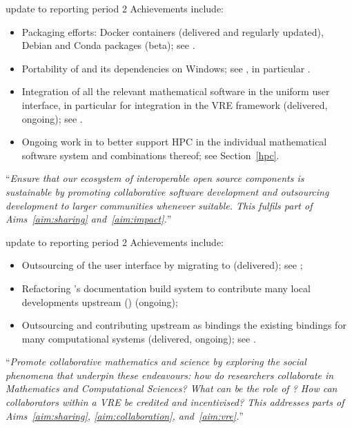 \begin{compactenum}[\bf O1\rm:]
\begin{oldpart}{update to reporting period 2}
  Achievements include:
  \begin{itemize}
  \item Packaging efforts: Docker containers (delivered and
    regularly updated), Debian and Conda packages (beta); see
    .
  \item Portability of \Sage and its dependencies on Windows; see
    , in particular
    .
  \item Integration of all the relevant mathematical software in the
    uniform \Jupyter user interface, in particular for integration in
    the VRE framework (delivered, ongoing); see
    .
  \item Ongoing work in  to better support HPC in the
    individual mathematical software system and combinations thereof;
    see Section~\ref{hpc}.
  \end{itemize}
\end{oldpart}

\item \label{objective:sustainable} ``\emph{Ensure that our ecosystem of
  interoperable open source components is \emph{sustainable} by
  promoting collaborative software development and outsourcing
  development to larger communities whenever suitable. This fulfils
  part of Aims~\ref{aim:sharing} and~\ref{aim:impact}.}''

\begin{oldpart}{update to reporting period 2}
  Achievements include:
  \begin{itemize}
  \item Outsourcing of the \Sage user interface by migrating to
    \Jupyter (delivered); see ;
  \item Refactoring \Sage's documentation build system to contribute
    many local developments upstream (\Sphinx)
     (ongoing);
  \item Outsourcing and contributing upstream as \Python bindings the
    existing \Sage bindings for many computational systems (delivered,
    ongoing); see .
  \end{itemize}
\end{oldpart}

\item \label{objective:social} ``\emph{Promote collaborative mathematics and
  science by exploring the social phenomena that underpin these
  endeavours: how do researchers collaborate in Mathematics and
  Computational Sciences?  What can be the role of \VREs?  How can
  collaborators within a VRE be credited and incentivised? This
  addresses parts of Aims~\ref{aim:sharing}, \ref{aim:collaboration},
  and~\ref{aim:vre}.}''


\end{compactenum}
